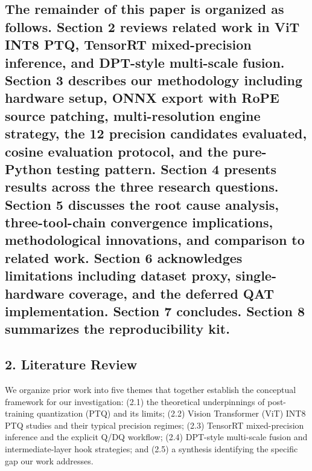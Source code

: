 \documentclass[
]{article}
\begin{document}
\subsection{The remainder of this paper is organized as follows. Section
2 reviews related work in ViT INT8 PTQ, TensorRT mixed-precision
inference, and DPT-style multi-scale fusion. Section 3 describes our
methodology including hardware setup, ONNX export with RoPE source
patching, multi-resolution engine strategy, the 12 precision candidates
evaluated, cosine evaluation protocol, and the pure-Python testing
pattern. Section 4 presents results across the three research questions.
Section 5 discusses the root cause analysis, three-tool-chain
convergence implications, methodological innovations, and comparison to
related work. Section 6 acknowledges limitations including dataset
proxy, single-hardware coverage, and the deferred QAT implementation.
Section 7 concludes. Section 8 summarizes the reproducibility
kit.}\label{the-remainder-of-this-paper-is-organized-as-follows-section-2-reviews-related-work-in-vit-int8-ptq-tensorrt-mixed-precision-inference-and-dpt-style-multi-scale-fusion-section-3-describes-our-methodology-including-hardware-setup-onnx-export-with-rope-source-patching-multi-resolution-engine-strategy-the-12-precision-candidates-evaluated-cosine-evaluation-protocol-and-the-pure-python-testing-pattern-section-4-presents-results-across-the-three-research-questions-section-5-discusses-the-root-cause-analysis-three-tool-chain-convergence-implications-methodological-innovations-and-comparison-to-related-work-section-6-acknowledges-limitations-including-dataset-proxy-single-hardware-coverage-and-the-deferred-qat-implementation-section-7-concludes-section-8-summarizes-the-reproducibility-kit}

\subsection{2. Literature Review}\label{2-literature-review}

We organize prior work into five themes that together establish the
conceptual framework for our investigation: (2.1) the theoretical
underpinnings of post-training quantization (PTQ) and its limits; (2.2)
Vision Transformer (ViT) INT8 PTQ studies and their typical precision
regimes; (2.3) TensorRT mixed-precision inference and the explicit Q/DQ
workflow; (2.4) DPT-style multi-scale fusion and intermediate-layer hook
strategies; and (2.5) a synthesis identifying the specific gap our work
addresses.
\end{document}

